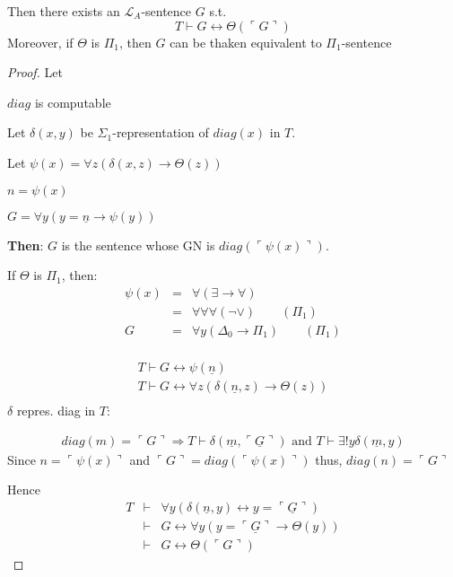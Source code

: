 \documentclass[12pt]{article}
\newcommand{\proves}{\vdash}
\newcommand{\gn}[1]{\ulcorner #1 \urcorner}
\begin{document}
Then there exists an $\mathcal{L}_A$-sentence $G$ s.t.
\[
T \proves G \leftrightarrow \Theta(\gn{G})
\]
Moreover, if $\Theta$ is $\Pi_1$, then $G$ can be thaken equivalent to $\Pi_1$-sentence
\begin{proof}
  Let 
  \iffalse %
  \[
  diag(n) =
  \begin{cases}
   \gn{\forall y ( y=n \rigtarrow \sigma(y))} %
   &\text{if $n = \gn{\sigma(x)}$ for some $\mathcal{L}_A$ formula $\sigma$} \\
   0 &\text{ o.w.}
  \end{cases}
  \]
  \fi
  $diag$ is computable

  Let $\delta(x,y)$ be $\Sigma_1$-representation of $diag(x)$ in $T$.

  Let $\psi(x) = \forall z \left( \delta(x,z) \rightarrow \Theta(z) \right)$

  $n = \psi(x)$

  $G = \forall y \left( y = \underline{n} \rightarrow \psi(y) \right)$

  \textbf{Then}: $G$ is the sentence whose GN is $diag(\gn{\psi(x)})$.

  If $\Theta$ is $\Pi_1$, then:
  \begin{align*}
    \psi(x) &=& \forall ( \exists \rightarrow \forall) \\
            &=& \forall \forall \forall (\neg \vee) \qquad (\Pi_1) \\
            G &=&  \forall y ( \Delta_0 \rightarrow \Pi_1) \qquad (\Pi_1) \\
  \end{align*}

\begin{align}
  \label{eq:star}
  T \proves G \leftrightarrow \psi(\underline{n}) \\
  T \proves G \leftrightarrow \forall z (\delta(\underline{n}, z) \rightarrow \Theta(z)) \\
\end{align}
$\delta$ repres. diag in $T$:

\begin{align*}
  diag(m) = 
  \gn{G} \Rightarrow T \proves \delta(\underline{m}, \underline{\gn{G}})
  \text{ and } T \proves \exists !y \delta(\underline{m},y)
\end{align*}
Since $n = \gn{\psi(x)}$ and $\gn{G} = diag(\gn{\psi(x)})$
thus, $diag(n) = \gn{G}$

Hence 
\begin{align*}
  T &\proves& \forall y \left( \delta(\underline{n}, y) \leftrightarrow
  y = \underline{\gn{G}} \right) \\
  &\proves& G \leftrightarrow \forall y (y = \underline{\gn{G}} \rightarrow \Theta(y)) \\
  &\proves& G \leftrightarrow \Theta(\gn{G})
\end{align*}
\end{proof}
\end{document}
